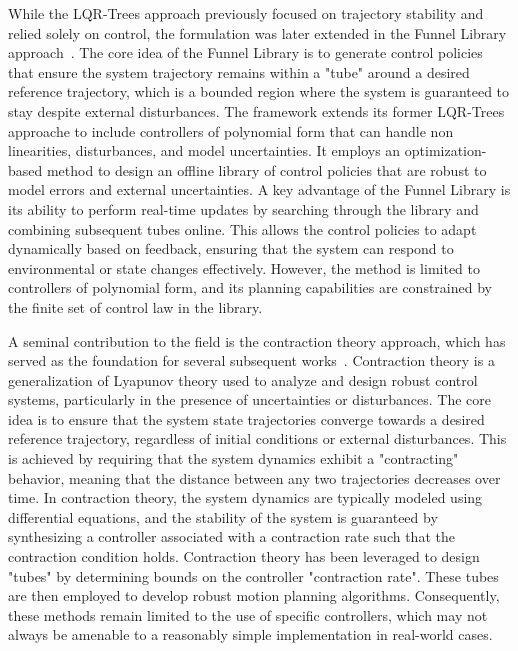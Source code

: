 While the LQR-Trees approach previously focused on trajectory stability and relied solely on  control, the formulation was later extended in the Funnel Library approach~\cite{cMajundarLibrary}.
The core idea of the Funnel Library is to generate control policies that ensure the system trajectory remains within a "tube" around a desired reference trajectory, which is a bounded region where the system is guaranteed to stay despite external disturbances.
The framework extends its former LQR-Trees approache to include controllers of polynomial form that can handle non linearities, disturbances, and model uncertainties.
It employs an optimization-based method to design an offline library of control policies that are robust to model errors and external uncertainties. 
A key advantage of the Funnel Library is its ability to perform real-time updates by searching through the library and combining subsequent tubes online. 
This allows the control policies to adapt dynamically based on feedback, ensuring that the system can respond to environmental or state changes effectively.
However, the method is limited to controllers of polynomial form, and its planning capabilities are constrained by the finite set of control law in the library.

A seminal contribution to the field is the contraction theory approach, which has served as the foundation for several subsequent works~\cite{cContractThControl,cContractThControlLearning,cContractThMP,cContractThOnlineMP}.
Contraction theory is a generalization of Lyapunov theory used to analyze and design robust control systems, particularly in the presence of uncertainties or disturbances. 
The core idea is to ensure that the system state trajectories converge towards a desired reference trajectory, regardless of initial conditions or external disturbances. 
This is achieved by requiring that the system dynamics exhibit a "contracting" behavior, meaning that the distance between any two trajectories decreases over time. 
In contraction theory, the system dynamics are typically modeled using differential equations, and the stability of the system is guaranteed by synthesizing a controller associated with a contraction rate such that the contraction condition holds. 
Contraction theory has been leveraged to design "tubes" by determining bounds on the controller "contraction rate". 
These tubes are then employed to develop robust motion planning algorithms. 
Consequently, these methods remain limited to the use of specific controllers, which may not always be amenable to a reasonably simple implementation in real-world cases.

